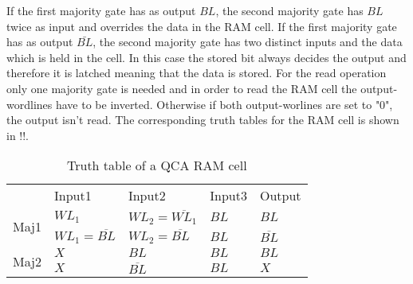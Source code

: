 If the first majority gate has as output $BL$, the second majority gate has $BL$ twice as input and overrides the data in the RAM cell. If the first majority gate has as output $\bar{BL}$, the second majority gate has two distinct inputs and the data which is held in the cell. In this case the stored bit always decides the output and therefore it is latched meaning that the data is stored. For the read operation only one majority gate is needed and in order to read the RAM cell the output-wordlines have to be inverted. Otherwise if both output-worlines are set to "0", the output isn't read. The corresponding truth tables for the RAM cell is shown in !!.
\begin{table}[htbp]
	\centering
	\caption{Truth table of a QCA RAM cell}
	\begin{tabular}{cllll}
		& Input1 & Input2 & Input3 & Output \\
		\multirow{2}[0]{*}{Maj1} & $WL_1$   & $WL_2=\overline{WL_1}$ & $BL$    & $BL$ \\
		& $WL_1=\overline{BL}$ & $WL_2=\overline{BL}$ & $BL$    & $\overline{BL}$ \\
		\multirow{2}[0]{*}{Maj2} & $X$     & $BL$    & $BL$    & $BL$ \\
		& $X$     & $\overline{BL}$ & $BL$    & $X$ \\
	\end{tabular}%
	\label{tab:RAM}%
\end{table}%

